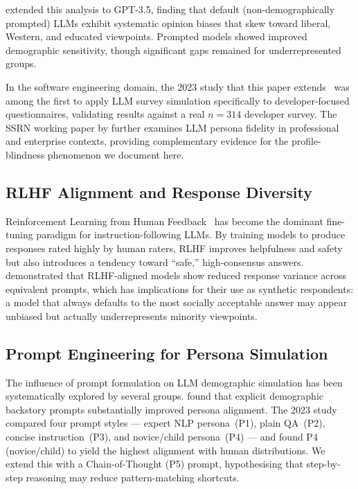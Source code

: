\documentclass[11pt,a4paper]{article}
\begin{document}
\citet{santurkar2023} extended this analysis to GPT-3.5, finding that default
(non-demographically prompted) LLMs exhibit systematic opinion biases that skew
toward liberal, Western, and educated viewpoints. Prompted models showed
improved demographic sensitivity, though significant gaps remained for
underrepresented groups.

In the software engineering domain, the 2023 study that this paper
extends~\citep{original2023} was among the first to apply LLM survey simulation
specifically to developer-focused questionnaires, validating results against a
real $n{=}314$ developer survey. The SSRN working paper by \citet{ssrn6829506}
further examines LLM persona fidelity in professional and enterprise contexts,
providing complementary evidence for the profile-blindness phenomenon we
document here.

\subsection{RLHF Alignment and Response Diversity}

Reinforcement Learning from Human Feedback~\citep{ouyang2022} has become the
dominant fine-tuning paradigm for instruction-following LLMs. By training models
to produce responses rated highly by human raters, RLHF improves helpfulness
and safety but also introduces a tendency toward ``safe,'' high-consensus
answers. \citet{perez2022} demonstrated that RLHF-aligned models show reduced
response variance across equivalent prompts, which has implications for their
use as synthetic respondents: a model that always defaults to the most socially
acceptable answer may appear unbiased but actually underrepresents minority
viewpoints.

\subsection{Prompt Engineering for Persona Simulation}

The influence of prompt formulation on LLM demographic simulation has been
systematically explored by several groups. \citet{argyle2023} found that
explicit demographic backstory prompts substantially improved persona alignment.
The 2023 study~\citep{original2023} compared four prompt styles --- expert NLP
persona~(P1), plain QA~(P2), concise instruction~(P3), and novice/child
persona~(P4) --- and found P4 (novice/child) to yield the highest alignment with
human distributions. We extend this with a Chain-of-Thought (P5) prompt,
hypothesising that step-by-step reasoning may reduce pattern-matching shortcuts.
\end{document}
